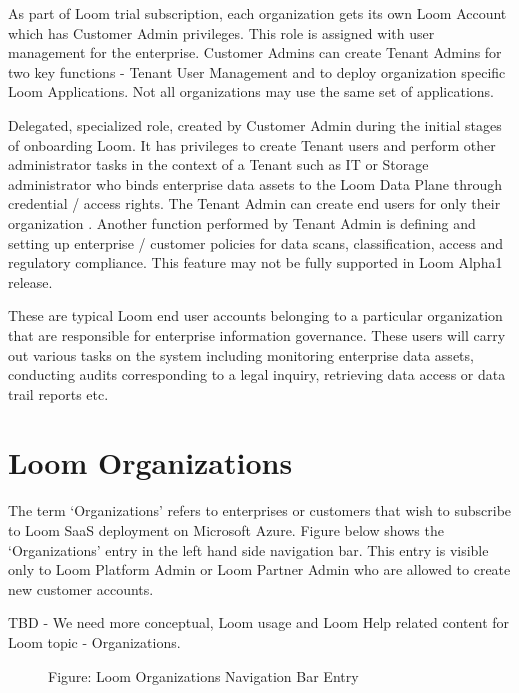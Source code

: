 \documentclass[letterpaper,10pt,english]{sphinxmanual}
\begin{document}
 As part of Loom trial subscription, each organization gets its own Loom Account which has Customer Admin privileges. This role is assigned with user management for the enterprise.  Customer Admins can create Tenant Admins for two key functions - Tenant User Management and to deploy organization specific Loom Applications.  Not all organizations may use the same set of applications.

 Delegated, specialized role, created by Customer Admin during the initial stages of onboarding Loom. It has privileges to create Tenant users and perform other administrator tasks in the context of a Tenant such as IT or Storage administrator who binds enterprise data assets to the Loom Data Plane through credential / access rights. The Tenant Admin can create end users for only their organization . Another function performed by Tenant Admin is defining and setting up enterprise / customer policies for data scans, classification, access and regulatory compliance. This feature may not be fully supported in Loom Alpha1 release.

 These are typical Loom end user accounts belonging to a particular organization that are responsible for enterprise information governance. These users will carry out various tasks on the system including monitoring enterprise data assets, conducting audits corresponding to a legal inquiry, retrieving data access or data trail reports etc.


\section{Loom Organizations}
\label{\detokenize{mcdmp_concepts:term-organizations}}\label{\detokenize{mcdmp_concepts:loom-organizations}}
The term ‘Organizations’ refers to enterprises or customers that wish to subscribe to Loom SaaS deployment on Microsoft Azure. Figure below shows the ‘Organizations’ entry in the left hand side navigation bar.  This entry is visible only to Loom Platform Admin or Loom Partner Admin who are allowed to create new customer accounts.

TBD - We need more conceptual, Loom usage and Loom Help related content for Loom topic - Organizations.

\begin{figure}[htbp]
\centering
\capstart

\noindent{}
\caption{Figure: Loom Organizations Navigation Bar Entry}\label{\detokenize{mcdmp_concepts:id17}}\end{figure}
\end{document}
